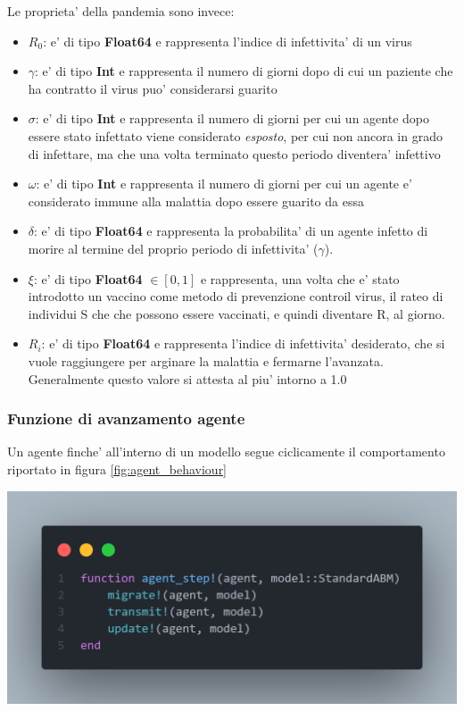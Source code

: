Le proprieta' della pandemia sono invece:
\begin{itemize}
	\item $R_0$: e' di tipo \textbf{Float64} e rappresenta l'indice di infettivita' di un virus
	\item $\gamma$: e' di tipo \textbf{Int} e rappresenta il numero di giorni dopo di cui un paziente
	che ha contratto il virus puo' considerarsi guarito
	\item $\sigma$: e' di tipo \textbf{Int} e rappresenta il numero di giorni per cui un agente dopo essere
	stato infettato viene considerato \emph{esposto}, per cui non ancora in grado di infettare, ma che una 
	volta terminato questo periodo diventera' infettivo
	\item $\omega$: e' di tipo \textbf{Int} e rappresenta il numero di giorni per cui un agente e' considerato
	immune alla malattia dopo essere guarito da essa
	\item $\delta$: e' di tipo \textbf{Float64} e rappresenta la probabilita' di un agente infetto di morire al 
	termine del proprio periodo di infettivita' ($\gamma$).
	\item $\xi$: e' di tipo \textbf{Float64} $\in [0,1]$ e rappresenta, una volta che e' stato introdotto un vaccino come metodo 
	di prevenzione controil virus, il rateo di individui S che che possono essere vaccinati, e quindi diventare R,
	al giorno.
	\item $R_i$: e' di tipo \textbf{Float64} e rappresenta l'indice di infettivita' desiderato, che si vuole
	raggiungere per arginare la malattia e fermarne l'avanzata. Generalmente questo valore si attesta al piu' 
	intorno a 1.0
\end{itemize}

\subsubsection*{Funzione di avanzamento agente}
Un agente finche' all'interno di un modello segue ciclicamente il comportamento
riportato in figura \ref{fig:agent_behaviour}

\begin{minipage}{\linewidth}
	\centering
	\includegraphics[width=\textwidth]{img/agent_behaviour.png}
	\label{fig:agent_behaviour}
\end{minipage}

